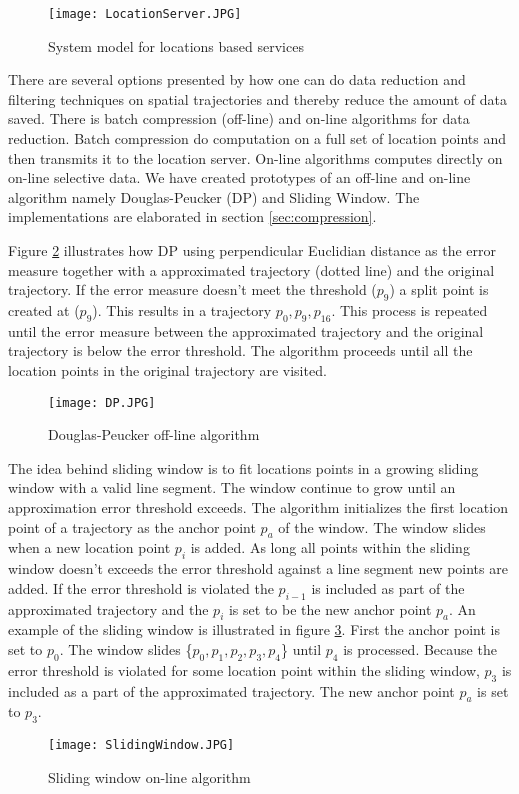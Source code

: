 \begin{figure}[H]
\centering
\texttt{[image: LocationServer.JPG]}

\caption{System model for locations based services}
\label{fig:system_model_for_locations_based_services}
\end{figure}


There are several options presented by \cite{Lee2011} how one can do data reduction and filtering techniques on spatial trajectories and thereby reduce the amount of data saved. There is batch compression (off-line) and on-line algorithms for data reduction. Batch compression do computation on a full set of location points and then transmits it to the location server. On-line algorithms computes directly on on-line selective data. We have created prototypes  of an off-line and on-line algorithm namely Douglas-Peucker (DP) and Sliding Window. The implementations are elaborated in section \ref{sec:compression}. 

Figure \ref{fig:douglas_peucker_algorithm} illustrates how DP using perpendicular Euclidian distance as the error measure together with a approximated trajectory (dotted line) and the original trajectory. If the error measure doesn't meet the threshold ($p_9$) a split point is created at ($p_9$). This results in a trajectory $p_0,p_9,p_{16}$. This process is repeated until the error measure between the approximated trajectory and the original trajectory is below the error threshold. The algorithm proceeds until all the location points in the original trajectory are visited.   

\begin{figure}[H]
\centering
\texttt{[image: DP.JPG]}
\caption{Douglas-Peucker off-line algorithm}
\label{fig:douglas_peucker_algorithm}
\end{figure}


The idea behind sliding window is to fit locations points in a growing sliding window with a valid line segment. The window continue to grow until an approximation error threshold exceeds. The algorithm initializes the first location point of a trajectory as the anchor point $p_a$ of the window. The window slides when a new location point $p_i$ is added. As long all points within the sliding window doesn't exceeds the error threshold against a line segment new points are added. If the error threshold is violated the $p_{i-1}$ is included as part of the approximated trajectory and the $p_i$ is set to be the new anchor point $p_a$. An example of the sliding window is illustrated in figure \ref{fig:sliding_window_algorithm}. First the anchor point is set to $p_0$. The window slides \{$p_0,p_1,p_2,p_3,p_4$\} until $p_4$ is processed. Because the error threshold is violated for some location point within the sliding window, $p_3$ is included as a part of the approximated trajectory. The new anchor point $p_a$ is set to $p_3$.       
\begin{figure}[H]
\centering
\texttt{[image: SlidingWindow.JPG]}

\caption{Sliding window on-line algorithm}
\label{fig:sliding_window_algorithm}
\end{figure}



